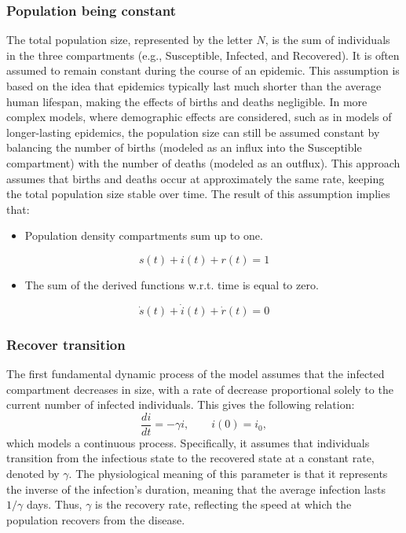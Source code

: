 \subsubsection{Population being constant}
The total population size, represented by the letter $N$, is the sum of individuals in the three compartments (e.g., Susceptible, Infected, and Recovered). It is often assumed to remain constant during the course of an epidemic. This assumption is based on the idea that epidemics typically last much shorter than the average human lifespan, making the effects of births and deaths negligible.
In more complex models, where demographic effects are considered, such as in models of longer-lasting epidemics, the population size can still be assumed constant by balancing the number of births (modeled as an influx into the Susceptible compartment) with the number of deaths (modeled as an outflux). This approach assumes that births and deaths occur at approximately the same rate, keeping the total population size stable over time. The result of this assumption implies that:
\begin{itemize}
	\item Population density compartments sum up to one.
\end{itemize}
\[s(t) + i(t) + r(t)= 1 \]
\begin{itemize}
	\item The sum of the derived functions w.r.t. time is equal to zero.
\end{itemize}
 \[\dot{s}(t)+ \dot{i}(t) + \dot{r}(t)= 0\]

\subsubsection{Recover transition} 
The first fundamental dynamic process of the model assumes that the infected compartment decreases in size, with a rate of decrease proportional solely to the current number of infected individuals. This gives the following relation:
\[\frac{d i}{dt} = - \gamma i, \qquad i(0) = i_0, \]
which models a continuous process. Specifically, it assumes that individuals transition from the infectious state to the recovered state at a constant rate, denoted by $\gamma$. The physiological meaning of this parameter is that it represents the inverse of the infection's duration, meaning that the average infection lasts $1/\gamma$ days. Thus, $\gamma$ is the recovery rate, reflecting the speed at which the population recovers from the disease.
 
